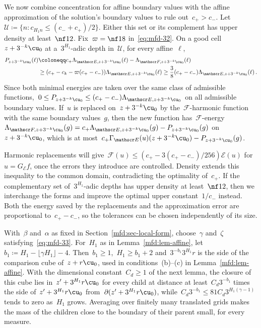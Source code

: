 \documentclass[11pt]{amsart}
\begin{document}
We now combine concentration for affine boundary values with the affine approximation of the solution's boundary values to rule out~$c_+>c_-$. Let~$\mathcal U\coloneqq\{n:c_{H_1n}\leq(c_-+c_+)/2\}$. Either this set or its complement has upper density at least~$\nf12$. Fix~$\varpi=\nf18$ in~\eqref{eq:mfd-32}. On a good cell~$z+3^{-k}\cu_0$ at a~$3^{H_1}$-adic depth in~$\mathcal U$, for every affine~$\ell$,
\begin{align*}
	P_{z+3^{-k}\cu_0}(\ell)&\coloneqq c_+\Lambda_{\mathscr E,z+3^{-k}\cu_0}(\ell)-\Lambda_{\mathscr F,z+3^{-k}\cu_0}(\ell)
	\notag \\
	&\geq(c_+-c_k-\varpi(c_+-c_-))\Lambda_{\mathscr E,z+3^{-k}\cu_0}(\ell)\geq\frac38(c_+-c_-)\Lambda_{\mathscr E,z+3^{-k}\cu_0}(\ell)\,.
\end{align*}
Since both minimal energies are taken over the same class of admissible functions,~$0\leq P_{z+3^{-k}\cu_0}\leq(c_+-c_-)\Lambda_{\mathscr E,z+3^{-k}\cu_0}$ on all admissible boundary values. If~$u$ is replaced on~$z+3^{-k}\cu_0$ by the~$\mathscr F$-harmonic function with the same boundary values~$g$, then the new function has~$\mathscr F$-energy~$\Lambda_{\mathscr F,z+3^{-k}\cu_0}(g)=c_+\Lambda_{\mathscr E,z+3^{-k}\cu_0}(g)-P_{z+3^{-k}\cu_0}(g)$ on~$z+3^{-k}\cu_0$, which is at most~$c_+\Gamma_{\mathscr E}(u)(z+3^{-k}\cu_0)-P_{z+3^{-k}\cu_0}(g)$.

\smallskip

Harmonic replacements will give~$\mathscr F(u)\leq(c_+-3(c_+-c_-)/256)\mathscr E(u)$ for~$u=G_{\mathscr E}f$, once the errors they introduce are controlled. Density extends this inequality to the common domain, contradicting the optimality of~$c_+$. If the complementary set of~$3^{H_1}$-adic depths has upper density at least~$\nf12$, then we interchange the forms and improve the optimal upper constant~$1/c_-$ instead. Both the energy saved by the replacements and the approximation error are proportional to~$c_+-c_-$, so the tolerances can be chosen independently of its size.

\smallskip

With~$\beta$ and~$\alpha$ as fixed in Section~\ref{mfd:sec-local-form}, choose~$\gamma$ and~$\zeta$ satisfying~\eqref{eq:mfd-33}. For~$H_1$ as in Lemma~\ref{mfd:lem-affine}, let~$b_1\coloneqq H_1-\lfloor\gamma H_1\rfloor-4$. Then~$b_1\geq1$,~$H_1\geq b_1+2$ and~$3^{-b_1}3^{H_1}r$ is the side of the comparison cube of~$z+r\cu_0$, used in conditions~(b)--(c) in Lemma~\ref{mfd:lem-affine}. With the dimensional constant~$C_d\geq1$ of the next lemma, the closure of this cube lies in~$z'+3^{H_1}r\cu_0$ for every child at distance at least~$C_d3^{-b_1}$ times the side of~$z'+3^{H_1}r\cu_0$ from~$\partial(z'+3^{H_1}r\cu_0)$, while~$C_d3^{-b_1}\leq81C_d3^{H_1(\gamma-1)}$ tends to zero as~$H_1$ grows. Averaging over finitely many translated grids makes the mass of the children close to the boundary of their parent small, for every measure.
\end{document}
